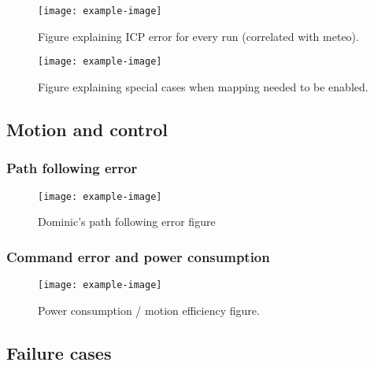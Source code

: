 \lightlipsum[1]

\begin{figure} [htpb]
	\centering
	\texttt{[image: example-image]}
	\caption{Figure explaining ICP error for every run (correlated with meteo).}
	\label{fig:icp_error}
\end{figure}

\begin{figure} [htpb]
	\centering
	\texttt{[image: example-image]}
	\caption{Figure explaining special cases when mapping needed to be enabled.}
	\label{fig:icp_failure}
\end{figure}

\subsection{Motion and control}
\label{sec:res_motion}

\lightlipsum[1]

\subsubsection{Path following error}
\label{sec:cmd_error}

\lightlipsum[1]

\begin{figure} [htpb]
	\centering
	\texttt{[image: example-image]}
	\caption{Dominic's path following error figure}
	\label{fig:pf_error}
\end{figure}

\subsubsection{Command error and power consumption}
\label{sec:cmd_error}

\lightlipsum[1]

\begin{figure} [htpb]
	\centering
	\texttt{[image: example-image]}
	\caption{Power consumption / motion efficiency figure.}
	\label{fig:moiton_power}
\end{figure}

\subsection{Failure cases}
\label{sec:fail}

\lightlipsum[1]